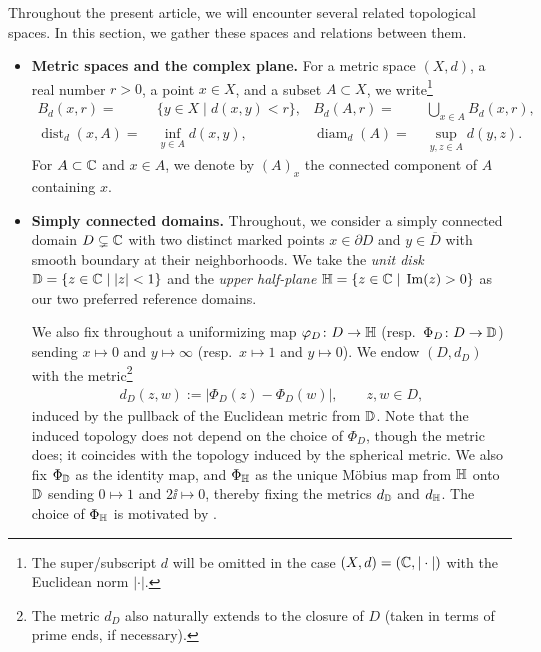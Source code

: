 \documentclass[a4paper, 11pt]{article}
\theoremstyle{definition}
\numberwithin{equation}{section}
\numberwithin{figure}{section}
\renewcommand\Im{\operatorname{Im}}
\newcommand{\Bmetric}[3][]{B_{#1}(#2,#3)}%
\newcommand{\dD}{d_{\bD}}
\newcommand{\dH}{d_{\bH}}
\renewcommand{\dist}[1][]{\operatorname{dist}_{#1}}
\renewcommand{\diam}[1][]{\operatorname{diam}_{#1}}
\newcommand{\component}[2]{(#1)_{#2}}
\newcommand{\cond}{\;|\;}
\begin{document}
Throughout the present article, we will encounter several related topological spaces. 
In this section, we gather these spaces and relations between them.

\begin{itemize}[leftmargin=*]
\item \textbf{Metric spaces and the complex plane.} 
For a metric space $(X, d)$, a real number $r > 0$, a point $x \in X$, and a subset $A \subset X$, 
we write\footnote{The super/subscript $d$ will be omitted in the case $(X,d) = (\mathbb{C},|\cdot|)$ with 
the Euclidean norm $|\cdot|$.}
\begin{align*}
\Bmetric[d]{x}{r} =\;& \{y \in X \cond d(x,y) < r\},  & \Bmetric[d]{A}{r} =\;& \bigcup_{x \in A} \Bmetric[d]{x}{r},\\
\dist[d](x, A) =\;& \inf_{y \in A} d(x,y) , 
& \diam[d](A) =\;& \sup_{y, z \in A}d(y,z).
\end{align*}
For $A \subset \mathbb{C}$ and $x \in A$, we denote by $\component{A}{x}$ the connected component of $A$ containing $x$.


\item \textbf{Simply connected domains.} 
Throughout, we consider a simply connected domain $D \subsetneq \mathbb{C}$ 
with two distinct marked points $x \in \partial D$ and $y \in \overline{D}$
with smooth boundary at their neighborhoods.
We take the \emph{unit disk} $\bD = \{z \in \bC \cond |z| < 1\}$ 
and the \emph{upper half-plane} $\bH = \{z \in \bC \cond \Im(z) > 0\}$ as our two preferred reference domains. 


We also fix throughout a uniformizing map $\varphi_D \colon D \to \mathbb{H}$ (resp.~$\Phi_D \colon D \to \mathbb{D}$) 
sending $x \mapsto 0$ and $y \mapsto \infty$
(resp.~$x \mapsto 1$ and $y \mapsto 0$). 
We endow $(D,d_D)$ with the metric\footnote{The metric $d_D$ also naturally extends to the closure of $D$ (taken in terms of prime ends, if necessary).} 
\begin{align*}
d_D(z, w) := |\Phi_D(z)-\Phi_D(w)| , \qquad  z, w \in D ,
\end{align*}
induced by the pullback of the Euclidean metric from $\mathbb{D}$. 
Note that the induced topology does not depend on the choice of $\Phi_D$, though the metric does; 
it coincides with the topology induced by the spherical metric. 
We also fix $\Phi_{\mathbb{D}}$ as the identity map, 
and $\Phi_{\mathbb{H}}$ as the unique M\"obius map from $\mathbb{H}$ onto $\mathbb{D}$ 
sending $0 \mapsto 1$ and $2\ii \mapsto 0$, 
thereby fixing the metrics $\dD$ and $\dH$. 
The choice of $\Phi_{\mathbb{H}}$ is motivated by . 



\end{itemize}
\end{document}
